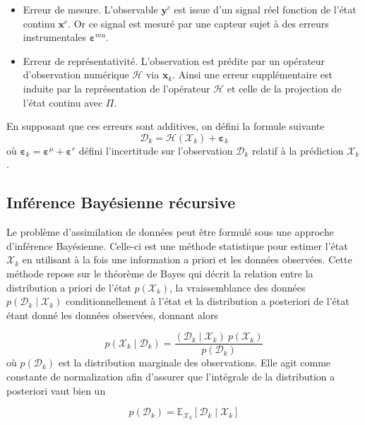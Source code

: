 \begin{itemize}
    \item Erreur de mesure. L'observable $\bm y^c$ est issue d'un signal réel fonction de l'état continu $\bm x^c$. Or ce signal est mesuré par une capteur sujet à des erreurs instrumentales $\bm \varepsilon^{mu}$.
    \item Erreur de représentativité. L'observation est prédite par un opérateur d'observation numérique $\mathcal H$ via $\bm x_k$. Ainsi une erreur supplémentaire est induite par la représentation de l'opérateur $\mathcal H$ et celle de la projection de l'état continu avec $\Pi$.
\end{itemize}

En supposant que ces erreurs sont additives, on défini la formule suivante
\begin{equation*}
    \mathcal D_k = \mathcal H (\mathcal{X}_k) + \bm{\varepsilon}_k
\end{equation*} où $\bm{\varepsilon}_k = \bm{\varepsilon}^\mu  + \bm{\varepsilon}^r$ défini l'incertitude sur l'observation $\mathcal D_k$ relatif à la prédiction $\mathcal{X}_k$.

\subsection{Inférence Bayésienne récursive}

Le problème d'assimilation de données peut être formulé sous une approche d'inférence Bayésienne. Celle-ci est une méthode statistique pour estimer l'état $\mathcal X_k$ en utilisant à la fois une information a priori et les données observées. Cette méthode repose sur le théorème de Bayes qui décrit la relation entre la distribution a priori de l'état $p(\mathcal X_k)$, la vraissemblance des données $p(\mathcal D_k \mid \mathcal X_k)$ conditionnellement à l'état et la distribution a posteriori de l'état étant donné les données observées, donnant alors

\begin{equation*}
    p(\mathcal X_k \mid \mathcal D_k) = \frac{(\mathcal D_k \mid \mathcal X_k)~p(\mathcal X_k)}{p(\mathcal D_k)}
\end{equation*}où $p(\mathcal D_k)$  est la distribution marginale des observations. Elle agit comme constante de normalization afin d'assurer que l'intégrale de la distribution a posteriori vaut bien un

\begin{equation*}
    p(\mathcal D_k) = \mathbb E_{\mathcal X_k}[\mathcal D_k \mid \mathcal X_k]
\end{equation*}

